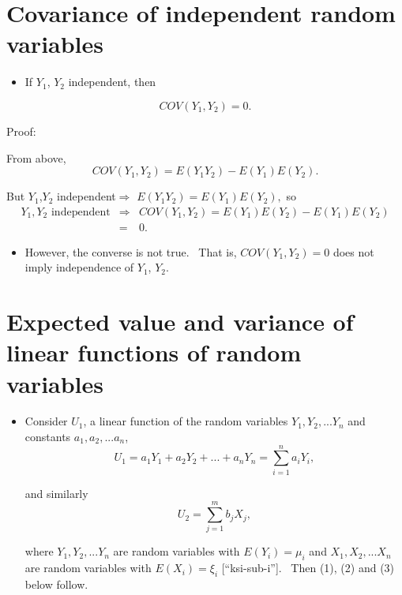 \documentclass[11pt]{article}
\begin{document}
\section{Covariance of independent random variables\protect\bigskip}

\begin{itemize}
\item If $Y_{1}$, $Y_{2}$ independent, then
\end{itemize}

\begin{equation*}
COV(Y_{1},Y_{2})=0.
\end{equation*}

Proof: \ 

From above,%
\begin{equation*}
COV(Y_{1},Y_{2})=E(Y_{1}Y_{2})-E(Y_{1})E(Y_{2}).
\end{equation*}

But $Y_{1}$,$Y_{2}$ independent$\Rightarrow $ $%
E(Y_{1}Y_{2})=E(Y_{1})E(Y_{2}),$ so%
\begin{eqnarray*}
Y_{1},Y_{2}\text{ independent} &\Rightarrow
&COV(Y_{1},Y_{2})=E(Y_{1})E(Y_{2})-E(Y_{1})E(Y_{2}) \\
&=&0.
\end{eqnarray*}

\begin{itemize}
\item However, the converse is not true. \ That is, $COV(Y_{1},Y_{2})=0$
does not imply independence of $Y_{1}$, $Y_{2}$.\bigskip
\end{itemize}

\section{Expected value and variance of linear functions of random variables%
\protect\bigskip}

\begin{itemize}
\item Consider $U_{1}$, a linear function of the random variables $%
Y_{1},Y_{2},...Y_{n}$ and constants $a_{1},a_{2},...a_{n}$,%
\begin{equation*}
U_{1}=a_{1}Y_{1}+a_{2}Y_{2}+...+a_{n}Y_{n}=\sum_{i=1}^{n}a_{i}Y_{i},
\end{equation*}

and similarly%
\begin{equation*}
U_{2}=\sum_{j=1}^{m}b_{j}X_{j},
\end{equation*}

where $Y_{1},Y_{2},...Y_{n}$ are random variables with $E(Y_{i})=\mu _{i}$
and $X_{1},X_{2},...X_{n}$ are random variables with $E(X_{i})=\xi _{i}$
[\textquotedblleft ksi-sub-i\textquotedblright ]. \ Then (1), (2) and (3)
below follow.\bigskip
\end{itemize}
\end{document}
